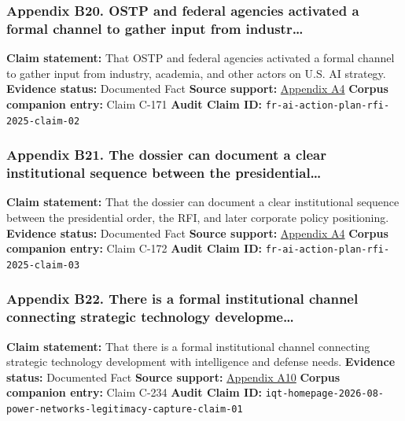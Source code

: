 \documentclass[
  american,
  11pt,
  letterpaper,
]{article}
\begin{document}
\subsubsection{Appendix B20. OSTP and federal agencies activated a
formal channel to gather input from
industr\ldots{}}\label{ch-07-appendix-b20-ostp-and-federal-agencies-activated-a-formal-channel-to-gather-input-from-industr}

\textbf{Claim statement:} That OSTP and federal agencies activated a
formal channel to gather input from industry, academia, and other actors
on U.S. AI strategy. \textbf{Evidence status:} Documented Fact
\textbf{Source support:}
\hyperref[ch-07-appendix-a4-request-for-information-on-the-development-of-an-artificial-intelligence-ai-action-plan]{Appendix
A4} \textbf{Corpus companion entry:} Claim C-171 \textbf{Audit Claim
ID:} \texttt{fr-ai-action-plan-rfi-2025-claim-02}

\subsubsection{Appendix B21. The dossier can document a clear
institutional sequence between the
presidential\ldots{}}\label{ch-07-appendix-b21-the-dossier-can-document-a-clear-institutional-sequence-between-the-presidential}

\textbf{Claim statement:} That the dossier can document a clear
institutional sequence between the presidential order, the RFI, and
later corporate policy positioning. \textbf{Evidence status:} Documented
Fact \textbf{Source support:}
\hyperref[ch-07-appendix-a4-request-for-information-on-the-development-of-an-artificial-intelligence-ai-action-plan]{Appendix
A4} \textbf{Corpus companion entry:} Claim C-172 \textbf{Audit Claim
ID:} \texttt{fr-ai-action-plan-rfi-2025-claim-03}

\subsubsection{Appendix B22. There is a formal institutional channel
connecting strategic technology
developme\ldots{}}\label{ch-07-appendix-b22-there-is-a-formal-institutional-channel-connecting-strategic-technology-developme}

\textbf{Claim statement:} That there is a formal institutional channel
connecting strategic technology development with intelligence and
defense needs. \textbf{Evidence status:} Documented Fact \textbf{Source
support:} \hyperref[ch-07-appendix-a10-in-q-tel]{Appendix A10}
\textbf{Corpus companion entry:} Claim C-234 \textbf{Audit Claim ID:}
\texttt{iqt-homepage-2026-08-power-networks-legitimacy-capture-claim-01}
\end{document}
